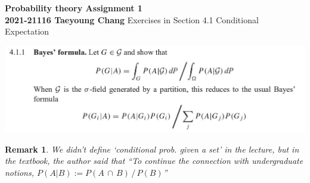 \documentclass[12pt, A4]{article}
\newtheorem*{remark}{Remark}
\newcommand{\intersect}{\,\cap\,}
\begin{document}
\begin{titlepage}
	\begin{center}
		\vspace*{5cm}
		\textbf{\Large Probability theory \MakeUppercase{} Assignment 1}
		\\
		\vspace{1.5cm}
		\textbf{2021-21116 Taeyoung Chang}
		\vfill
		Exercises in Section 4.1 Conditional Expectation
		\\
	
		\vspace*{3cm}
		\thispagestyle{empty}
	\end{center}
\end{titlepage}

\includegraphics{Exer4.1.1.JPG}
\begin{remark}
    We didn't define `conditional prob. given a set' in the lecture, but in the textbook, the author said that ``To continue the connection with undergraduate notions, $P(A|B):=P(A\intersect B)\,/\,P(B)$''
\end{remark}
\end{document}
